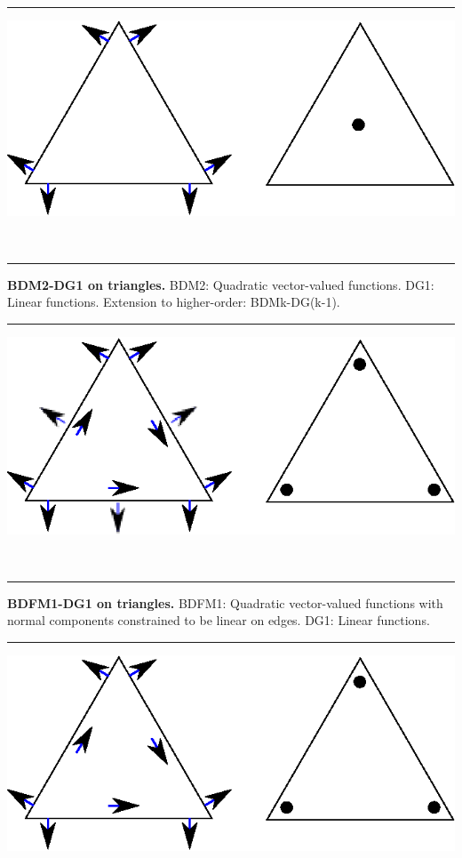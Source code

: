 \documentclass[landscape]{imposter}
\begin{document}
\begin{multicols*}{3}
\parbox{25cm}{\hrule height 0pt width 0pt 
\includegraphics{BDM1_DOFS}} \vspace{1cm} \\
\parbox{25cm}{\hrule height 0pt width 0pt {\bfseries BDM2-DG1 on triangles.}
BDM2: Quadratic vector-valued functions. DG1: Linear functions. Extension
to higher-order: BDMk-DG(k-1).}
\hspace{1cm}
\parbox{25cm}{\hrule height 0pt width 0pt \includegraphics{BDM2_DOFS}}
\vspace{1cm} \\
\parbox{25cm}{\hrule height 0pt width 0pt {\bfseries BDFM1-DG1 on triangles.}  BDFM1: Quadratic vector-valued functions
    with normal components constrained to be linear on edges. DG1:
    Linear functions.}
\hspace{1cm}
\parbox{25cm}{\hrule height 0pt width 0pt
  \includegraphics{BDFM1_DOFS}}


\end{multicols*}
\end{document}
